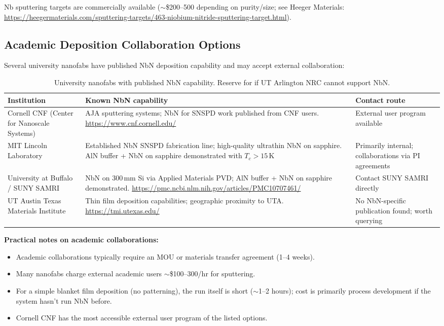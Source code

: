 Nb sputtering targets are commercially available ($\sim$\$200--500 depending on purity/size;
see Heeger Materials:
\url{https://heegermaterials.com/sputtering-targets/463-niobium-nitride-sputtering-target.html}).

\subsection{Academic Deposition Collaboration Options}
\label{sec:nbn_academic}

Several university nanofabs have published NbN deposition capability and may accept
external collaboration:

\begin{table}[ht]
\centering
\caption{University nanofabs with published NbN capability.
  Reserve for if UT Arlington NRC cannot support NbN.}
\label{tab:nbn_academic}
\small
\begin{tabular}{@{}p{4cm}p{5cm}p{4cm}@{}}
\toprule
Institution & Known NbN capability & Contact route \\
\midrule
Cornell CNF (Center for Nanoscale Systems) &
  AJA sputtering systems; NbN for SNSPD work published from CNF users.
  \url{https://www.cnf.cornell.edu/} &
  External user program available \\
MIT Lincoln Laboratory &
  Established NbN SNSPD fabrication line; high-quality ultrathin NbN on sapphire.
  AlN buffer + NbN on sapphire demonstrated with $T_c > 15$\,K &
  Primarily internal; collaborations via PI agreements \\
University at Buffalo / SUNY SAMRI &
  NbN on 300\,mm Si via Applied Materials PVD; AlN buffer + NbN on sapphire demonstrated.
  \url{https://pmc.ncbi.nlm.nih.gov/articles/PMC10707461/} &
  Contact SUNY SAMRI directly \\
UT Austin Texas Materials Institute &
  Thin film deposition capabilities; geographic proximity to UTA.
  \url{https://tmi.utexas.edu/} &
  No NbN-specific publication found; worth querying \\
\bottomrule
\end{tabular}
\end{table}

\textbf{Practical notes on academic collaborations:}
\begin{itemize}
  \item Academic collaborations typically require an MOU or materials transfer agreement (1--4 weeks).
  \item Many nanofabs charge external academic users $\sim$\$100--300/hr for sputtering.
  \item For a simple blanket film deposition (no patterning), the run itself is short ($\sim$1--2 hours);
    cost is primarily process development if the system hasn't run NbN before.
  \item Cornell CNF has the most accessible external user program of the listed options.
\end{itemize}

